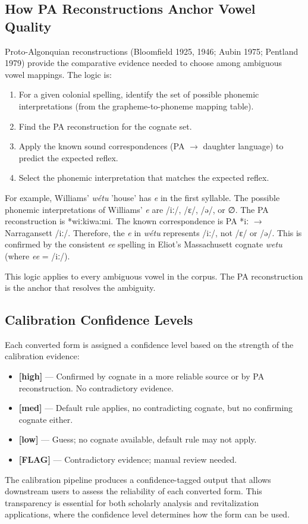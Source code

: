 \subsection{How PA Reconstructions Anchor Vowel Quality}

Proto-Algonquian reconstructions (Bloomfield 1925, 1946; Aubin 1975;
Pentland 1979) provide the comparative evidence needed to choose among
ambiguous vowel mappings. The logic is:

\begin{enumerate}
  \item For a given colonial spelling, identify the set of possible phonemic
    interpretations (from the grapheme-to-phoneme mapping table).

  \item Find the PA reconstruction for the cognate set.

  \item Apply the known sound correspondences (PA $\rightarrow$ daughter
    language) to predict the expected reflex.

  \item Select the phonemic interpretation that matches the expected reflex.
\end{enumerate}

For example, Williams' \textit{wétu} 'house' has \textit{e} in the first
syllable. The possible phonemic interpretations of Williams' \textit{e} are
/iː/, /ɛ/, /ə/, or ∅. The PA reconstruction is *wiːkiwaːmi. The known
correspondence is PA *iː $\rightarrow$ Narragansett /iː/. Therefore, the
\textit{e} in \textit{wétu} represents /iː/, not /ɛ/ or /ə/. This is
confirmed by the consistent \textit{ee} spelling in Eliot's Massachusett
cognate \textit{wetu} (where \textit{ee} = /iː/).

This logic applies to every ambiguous vowel in the corpus. The PA
reconstruction is the anchor that resolves the ambiguity.

\subsection{Calibration Confidence Levels}

Each converted form is assigned a confidence level based on the strength of
the calibration evidence:

\begin{itemize}
  \item \textbf{[high]} --- Confirmed by cognate in a more reliable source or
    by PA reconstruction. No contradictory evidence.

  \item \textbf{[med]} --- Default rule applies, no contradicting cognate,
    but no confirming cognate either.

  \item \textbf{[low]} --- Guess; no cognate available, default rule may not
    apply.

  \item \textbf{[FLAG]} --- Contradictory evidence; manual review needed.
\end{itemize}

The calibration pipeline produces a confidence-tagged output that allows
downstream users to assess the reliability of each converted form. This
transparency is essential for both scholarly analysis and revitalization
applications, where the confidence level determines how the form can be
used.
